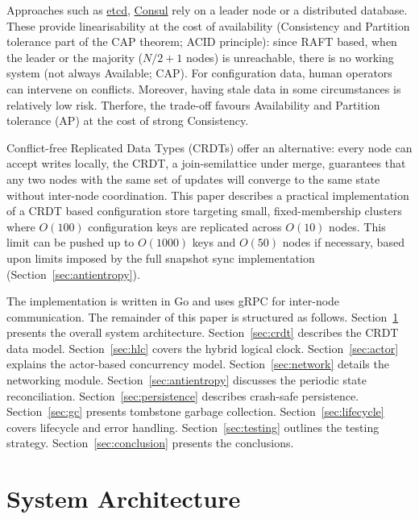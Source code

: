 \documentclass[conference]{IEEEtran}
\begin{document}
Approaches such as \href{https://etcd.io/}{etcd},
\href{https://developer.hashicorp.com/consul}{Consul} rely on a leader node or a
distributed database. These provide linearisability at the cost of availability
({\color{violet}Consistency and Partition tolerance part of the CAP theorem\cite{gilbert2012}}; ACID principle): since RAFT\cite{raft}
based, when the leader or the majority ($N/2+1$ nodes) is unreachable,
there is no working system (not always Available; CAP\cite{gilbert2012}). For configuration data, human operators can intervene
on conflicts. Moreover, having stale data in some circumstances is relatively low risk.
{\color{violet}Therfore}, the trade-off favours Availability and Partition tolerance {\color{violet}
(AP\cite{gilbert2012})} {\color{violet}at the cost of strong} Consistency.

Conflict-free Replicated Data Types (CRDTs) \cite{shapiro2011} offer an
alternative: every node can accept writes locally, the {\color{violet}CRDT, a join-semilattice under merge,} guarantees that any two nodes with the same set of updates will
converge to the same state without inter-node coordination. This paper describes a
practical implementation of a CRDT based configuration store targeting small,
fixed-membership clusters where $O(100)$ configuration keys are replicated
across $O(10)$ nodes. This limit can be pushed up to $O(1000)$ keys and $O(50)$ nodes
if necessary, based upon limits imposed by the full snapshot sync implementation (Section~\ref{sec:antientropy}).

The implementation is written in Go and uses gRPC for inter-node
communication. The remainder of this paper is structured as follows.
Section~\ref{sec:arch} presents the overall system architecture.
Section~\ref{sec:crdt} describes the CRDT data model.
Section~\ref{sec:hlc} covers the hybrid logical clock.
Section~\ref{sec:actor} explains the actor-based concurrency model.
Section~\ref{sec:network} details the networking module.
Section~\ref{sec:antientropy} discusses the periodic state reconciliation.
Section~\ref{sec:persistence} describes crash-safe persistence.
Section~\ref{sec:gc} presents tombstone garbage collection.
Section~\ref{sec:lifecycle} covers lifecycle and error handling.
Section~\ref{sec:testing} outlines the testing strategy.
Section~\ref{sec:conclusion} presents the conclusions.

\section{System Architecture}
\label{sec:arch}
\end{document}
